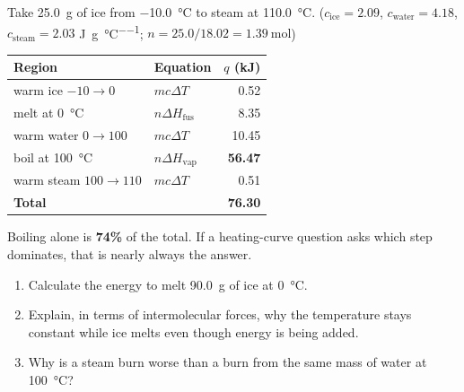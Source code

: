 \documentclass{apchem-notes}
\begin{document}
\begin{workedexample}
Take \SI{25.0}{\gram} of ice from \SI{-10.0}{\celsius} to steam at
\SI{110.0}{\celsius}. ($c_{\text{ice}} = 2.09$,
$c_{\text{water}} = 4.18$, $c_{\text{steam}} = 2.03$
\si{\joule\per\gram\per\celsius}; $n = 25.0/18.02 = \SI{1.39}{\mole}$)

\begin{center}
\begin{tabular}{@{}llr@{}}
\hline
\textbf{Region} & \textbf{Equation} & \textbf{$q$ (kJ)} \\
\hline
warm ice $-10 \to 0$ & $mc\Delta T$ & 0.52 \\
melt at \SI{0}{\celsius} & $n\Delta H_{\text{fus}}$ & 8.35 \\
warm water $0 \to 100$ & $mc\Delta T$ & 10.45 \\
boil at \SI{100}{\celsius} & $n\Delta H_{\text{vap}}$ & \textbf{56.47} \\
warm steam $100 \to 110$ & $mc\Delta T$ & 0.51 \\
\hline
\textbf{Total} & & \textbf{76.30} \\
\hline
\end{tabular}
\end{center}

Boiling alone is \textbf{74\%} of the total. If a heating-curve question
asks which step dominates, that is nearly always the answer.
\end{workedexample}


\begin{enumerate}[leftmargin=*,itemsep=0.4em]
  \item Calculate the energy to melt \SI{90.0}{\gram} of ice at
        \SI{0}{\celsius}. \workspace[2cm]
  \item Explain, in terms of intermolecular forces, why the temperature
        stays constant while ice melts even though energy is being added.
  \item Why is a steam burn worse than a burn from the same mass of water
        at \SI{100}{\celsius}? 
\end{enumerate}
\end{document}
